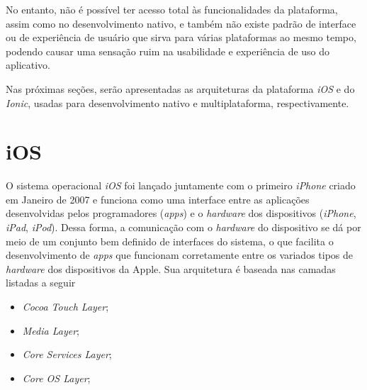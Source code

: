 No entanto, não é possível ter acesso total às funcionalidades da plataforma, assim como no desenvolvimento nativo, e também não existe padrão de interface ou de experiência de usuário que sirva
para várias plataformas ao mesmo tempo, podendo causar uma sensação ruim na usabilidade e experiência de uso do aplicativo. 


Nas próximas seções, serão apresentadas as arquiteturas da plataforma \textit{iOS} e do \textit{Ionic}, usadas para desenvolvimento nativo e multiplataforma, respectivamente.


\section{iOS} \label{ios}

O sistema operacional \textit{iOS} foi lançado juntamente com o primeiro \textit{iPhone} criado em Janeiro de 2007 e 
funciona como uma interface entre as aplicações desenvolvidas pelos programadores (\textit{apps}) e o \textit{hardware} 
dos dispositivos (\textit{iPhone}, \textit{iPad}, \textit{iPod}). Dessa forma, a comunicação com o \textit{hardware} do dispositivo se dá 
por meio de um conjunto bem definido de interfaces do sistema, o que facilita o desenvolvimento de \textit{apps} 
que funcionam corretamente entre os variados tipos de \textit{hardware} dos dispositivos da Apple. 
Sua arquitetura é baseada nas camadas listadas a seguir%
 

\begin{itemize}

	\item \textit{Cocoa Touch Layer};
	\item \textit{Media Layer};
	\item \textit{Core Services Layer};
	\item \textit{Core OS Layer};

\end{itemize}

